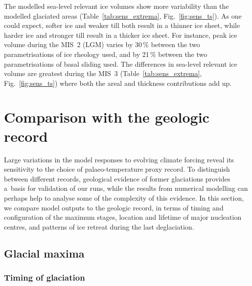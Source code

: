 \documentclass[tc, manuscript]{copernicus}
\begin{document}
      The modelled sea-level relevant ice volumes show more variability than
      the modelled glaciated areas (Table~\ref{tab:sens_extrema},
      Fig.~\ref{fig:sens_ts}). As one could expect, softer ice and weaker
      till both result in a thinner ice sheet, while harder ice and stronger
      till result in a thicker ice sheet. For instance, peak ice volume
      during the MIS~2 (LGM) varies by 30\,\unit{\%} between the two
      parametrisations of ice rheology used, and by 21\,\unit{\%} between
      the two parametrisations of basal sliding used. The differences in
      sea-level relevant ice volume are greatest during the MIS~3
      (Table~\ref{tab:sens_extrema}, Fig.~\ref{fig:sens_ts}) where both the
      areal and thickness contributions add up.


\section{Comparison with the geologic record}
\label{sec:discussion}

      Large variations in the model responses to evolving climate forcing
      reveal its sensitivity to the choice of palaeo-temperature proxy
      record. To distinguish between different records, geological evidence
      of former glaciations provides a~basis for validation of our runs,
      while the results from numerical modelling can perhaps help to analyse
      some of the complexity of this evidence. In this section, we compare
      model outputs to the geologic record, in terms of timing and
      configuration of the maximum stages, location and lifetime of major
      nucleation centres, and patterns of ice retreat during the last
      deglaciation.

\subsection{Glacial maxima}

\subsubsection{Timing of glaciation}
\label{sec:timing}
\end{document}

